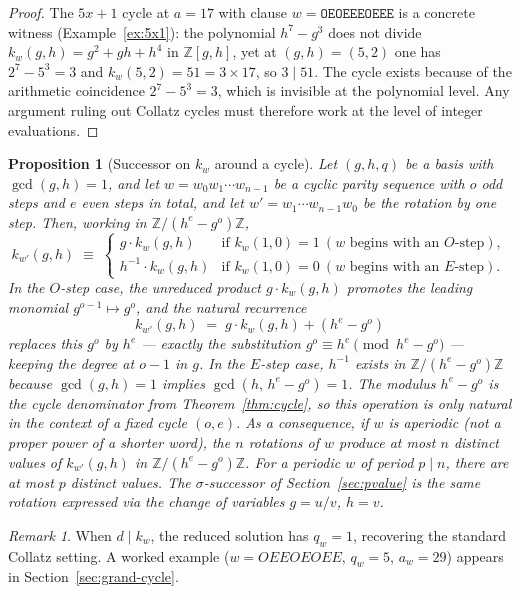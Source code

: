 \documentclass[12pt]{article}
\newtheorem{proposition}[theorem]{Proposition}
\theoremstyle{definition}
\theoremstyle{remark}
\newtheorem{remark}[theorem]{Remark}
\newcommand{\ZZ}{\mathbb{Z}}
\newcommand{\kpoly}{k}
\begin{document}
\begin{proof}
The $5x+1$ cycle at $a = 17$ with clause $w = \texttt{OEOEEEOEEE}$ is a concrete
witness (Example~\ref{ex:5x1}): the polynomial $h^7 - g^3$ does not divide
$\kpoly_w(g,h) = g^2 + gh + h^4$ in $\ZZ[g,h]$, yet at $(g,h) = (5,2)$
one has $2^7 - 5^3 = 3$ and $\kpoly_w(5,2) = 51 = 3 \times 17$, so $3
\mid 51$.  The cycle exists because of the arithmetic coincidence $2^7 - 5^3
= 3$, which is invisible at the polynomial level.  Any argument ruling out
Collatz cycles must therefore work at the level of integer evaluations.
\end{proof}

\begin{proposition}[Successor on $\kpoly_w$ around a cycle]
\label{prop:ksucc}
Let $(g,h,q)$ be a basis with $\gcd(g,h) = 1$, and let
$w = w_0 w_1 \cdots w_{n-1}$ be a cyclic parity sequence with $o$ odd
steps and $e$ even steps in total, and let $w' = w_1 \cdots w_{n-1} w_0$
be the rotation by one step.  Then, working in $\ZZ/(h^e-g^o)\ZZ$,
\[
  \kpoly_{w'}(g,h)
  \;\equiv\;
  \begin{cases}
    g\cdot\kpoly_w(g,h) & \text{if } \kpoly_w(1,0) = 1\ (\text{$w$ begins with an $O$-step}), \\[4pt]
    h^{-1}\cdot\kpoly_w(g,h) & \text{if } \kpoly_w(1,0) = 0\ (\text{$w$ begins with an $E$-step}).
  \end{cases}
\]
In the $O$-step case, the unreduced product $g\cdot\kpoly_w(g,h)$ promotes
the leading monomial $g^{o-1}\mapsto g^o$, and the natural recurrence
\[
  \kpoly_{w'}(g,h) \;=\; g\cdot\kpoly_w(g,h) + (h^e - g^o)
\]
replaces this $g^o$ by $h^e$ — exactly the substitution $g^o\equiv h^e
\pmod{h^e-g^o}$ — keeping the degree at $o-1$ in $g$.  In the $E$-step
case, $h^{-1}$ exists in $\ZZ/(h^e-g^o)\ZZ$ because $\gcd(g,h)=1$ implies
$\gcd(h,\,h^e-g^o)=1$.  The modulus $h^e - g^o$ is the cycle denominator
from Theorem~\ref{thm:cycle}, so this operation is only natural in the
context of a fixed cycle $(o,e)$.
As a consequence, if $w$ is aperiodic (not a proper power of a shorter word),
the $n$ rotations of $w$ produce at most $n$ distinct values of
$\kpoly_{w'}(g,h)$ in $\ZZ/(h^e-g^o)\ZZ$.
For a periodic $w$ of period $p \mid n$, there are at most $p$ distinct values.
The $\sigma$-successor of Section~\ref{sec:pvalue} is the same rotation
expressed via the change of variables $g = u/v$, $h = v$.
\end{proposition}

\begin{remark}
When $d \mid \kpoly_w$, the reduced solution has $q_w = 1$, recovering the
standard Collatz setting.
A worked example ($w = OEEOEOEE$, $q_w = 5$, $a_w = 29$) appears in
Section~\ref{sec:grand-cycle}.
\end{remark}
\end{document}
